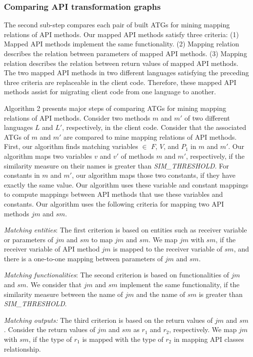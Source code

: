 \subsubsection{Comparing API transformation graphs}

The second sub-step compares each pair of built ATGs for mining mapping
relations of API methods. Our mapped API methods satisfy three
criteria: (1) Mapped API methods implement the same
functionality. (2) Mapping relation describes the relation
between parameters of mapped API methods. (3) Mapping relation
describes the relation between return values of
mapped API methods. The two mapped API methods in two
different languages satisfying the preceding three criteria
are replaceable in the client code. Therefore, these mapped API
methods assist for migrating client code from one language to another.

Algorithm 2 presents major steps of comparing ATGs for mining
mapping relations of API methods. Consider two methods $m$ and $m'$
of two different languages $L$ and $L'$, respectively, in the client
code. Consider that the associated ATGs of $m$ and $m'$ are compared
to mine mapping relations of API methods. First, our algorithm finds
matching variables $\in$ $F$, $V$, and $P_1$ in $m$ and $m'$. Our
algorithm maps two variables $v$ and $v'$ of methods $m$ and $m'$,
respectively, if the similarity measure on their names is greater
than \emph{SIM\_THRESHOLD}. For constants in $m$ and $m'$, our
algorithm maps those two constants, if they have exactly the same
value. Our algorithm uses these variable and constant mappings to
compute mappings between API methods that use these variables and
constants. Our algorithm uses the following criteria for mapping two
API methods $jm$ and $sm$.

\emph{Matching entities}: The first criterion is based on entities such as receiver variable
or parameters of $jm$ and $sm$ to map $jm$ and $sm$. We map $jm$ with $sm$, if
the receiver variable of API method $jm$ is mapped
to the receiver variable of $sm$, and there is a one-to-one mapping between parameters
of $jm$ and $sm$.

\emph{Matching functionalities}: The second criterion is based on functionalities of
$jm$ and $sm$. We consider that $jm$ and $sm$ implement the same functionality,
if the similarity measure between the name of $jm$ and the name of $sm$ is
greater than \emph{SIM\_THRESHOLD}.

\emph{Matching outputs:} The third criterion is based on the return values of $jm$ and $sm$.
Consider the return values of $jm$ and $sm$ as $r_1$ and $r_2$, respectively. We map $jm$
with $sm$, if the type of $r_1$ is mapped with the type of $r_2$ in mapping API classes
relationship.

